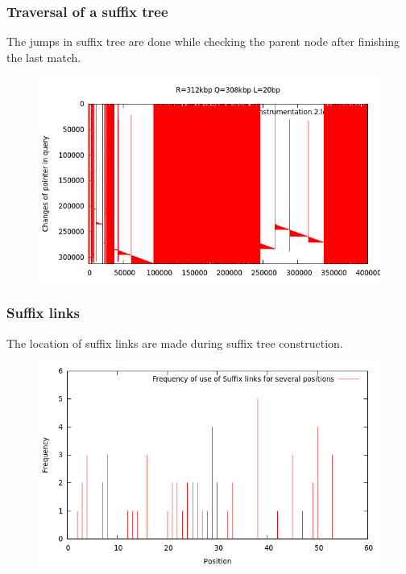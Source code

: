 \documentclass{beamer}
\begin{document}
\begin{frame}
  \frametitle{Traversal of a suffix tree}
  \begin{block}{}
    The jumps in suffix tree are done while checking the parent node after finishing the last match.
  \end{block}
  \begin{figure}\includegraphics[scale=0.4]{r312kbp-q308kbp-l20.png}\end{figure}
\end{frame}
\begin{frame}
  \frametitle{Suffix links}
  \begin{block}{}
    The location of suffix links are made during suffix tree construction.
  \end{block}
  \begin{figure}\includegraphics[scale=0.5]{histogram2.png}\end{figure}
\end{frame}
\end{document}
